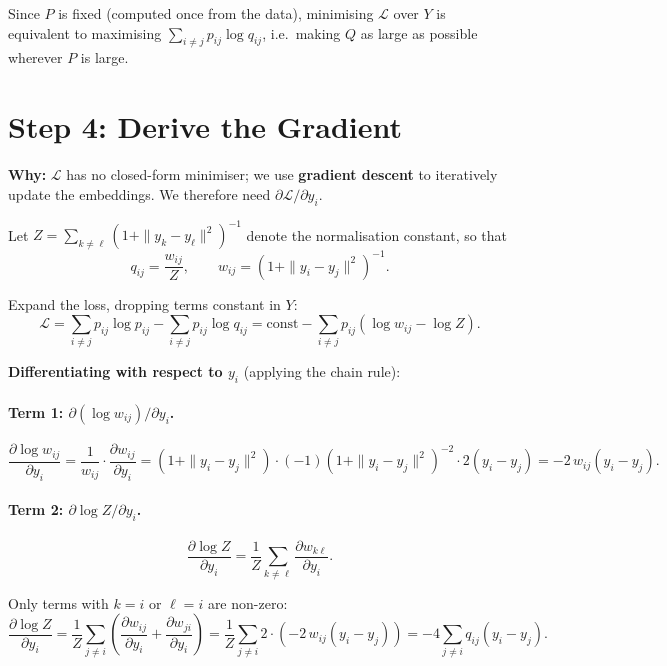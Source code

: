 \documentclass[11pt]{article}
\begin{document}
Since $P$ is fixed (computed once from the data), minimising $\mathcal{L}$
over $Y$ is equivalent to maximising $\sum_{i\neq j} p_{ij}\log q_{ij}$, i.e.\
making $Q$ as large as possible wherever $P$ is large.

\section*{Step 4: Derive the Gradient}

\textbf{Why:} $\mathcal{L}$ has no closed-form minimiser; we use
\textbf{gradient descent} to iteratively update the embeddings. We therefore
need $\partial \mathcal{L} / \partial y_i$.

Let $Z = \sum_{k \neq \ell}(1 + \|y_k - y_\ell\|^2)^{-1}$ denote the
normalisation constant, so that
\[
  q_{ij} = \frac{w_{ij}}{Z}, \qquad w_{ij} = \left(1+\|y_i-y_j\|^2\right)^{-1}.
\]

Expand the loss, dropping terms constant in $Y$:
\[
  \mathcal{L}
  = \sum_{i\neq j} p_{ij}\log p_{ij}
  - \sum_{i\neq j} p_{ij}\log q_{ij}
  = \text{const} - \sum_{i\neq j} p_{ij}(\log w_{ij} - \log Z).
\]

\textbf{Differentiating with respect to $y_i$} (applying the chain rule):

\paragraph{Term 1: $\partial(\log w_{ij})/\partial y_i$.}

\[
  \frac{\partial \log w_{ij}}{\partial y_i}
  = \frac{1}{w_{ij}}\cdot\frac{\partial w_{ij}}{\partial y_i}
  = (1+\|y_i-y_j\|^2) \cdot (-1)(1+\|y_i-y_j\|^2)^{-2} \cdot 2(y_i-y_j)
  = -2\,w_{ij}(y_i-y_j).
\]

\paragraph{Term 2: $\partial \log Z / \partial y_i$.}

\[
  \frac{\partial \log Z}{\partial y_i}
  = \frac{1}{Z}\sum_{k\neq\ell}\frac{\partial w_{k\ell}}{\partial y_i}.
\]

Only terms with $k=i$ or $\ell=i$ are non-zero:
\[
  \frac{\partial \log Z}{\partial y_i}
  = \frac{1}{Z}\sum_{j\neq i}
    \left(\frac{\partial w_{ij}}{\partial y_i}+\frac{\partial w_{ji}}{\partial y_i}\right)
  = \frac{1}{Z}\sum_{j\neq i} 2 \cdot(-2\,w_{ij}(y_i-y_j))
  = -4\sum_{j\neq i}q_{ij}(y_i-y_j).
\]
\end{document}
